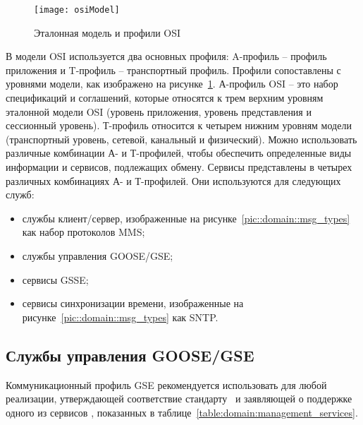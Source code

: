\begin{figure}[ht]
    \centering
    \texttt{[image: osiModel]}
    \caption{Эталонная модель и профили OSI}
    \label{pic::domain::osi_model}
\end{figure}

В модели OSI используется два основных профиля: A-профиль -- профиль приложения
и T-профиль -- транспортный профиль. Профили сопоставлены с уровнями модели,
как изображено на рисунке~\ref{pic::domain::osi_model}. А-профиль OSI --
это набор спецификаций и соглашений, которые относятся к трем верхним уровням
эталонной модели OSI (уровень приложения, уровень представления и сессионный
уровень). Т-профиль относится к четырем нижним уровням модели
(транспортный уровень, сетевой, канальный и физический). Можно использовать
различные комбинации А- и Т-профилей, чтобы обеспечить определенные виды информации
и сервисов, подлежащих обмену. Сервисы представлены в четырех различных комбинациях
А- и Т-профилей. Они используются для следующих служб:

\begin{itemize}
    \item службы клиент/сервер, изображенные на рисунке~\ref{pic::domain::msg_types} как набор протоколов MMS;
    \item службы управления GOOSE/GSE;
    \item сервисы GSSE;
    \item сервисы синхронизации времени, изображенные на рисунке~\ref{pic::domain::msg_types} как SNTP.
\end{itemize}


\subsection{Службы управления GOOSE/GSE}

Коммуникационный профиль GSE рекомендуется использовать для любой реализации,
утверждающей соответствие стандарту \ и заявляющей
о поддержке одного из сервисов , показанных
в таблице~\ref{table:domain:management_services}.

